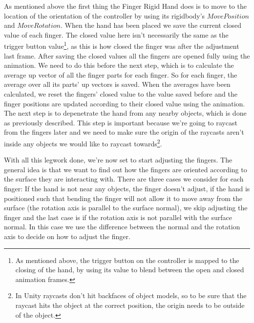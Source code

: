 As mentioned above the first thing the Finger Rigid Hand does is to move to the location of the orientation of the controller by using its rigidbody's $MovePosition$ and $MoveRotation$. When the hand has been placed we save the current closed value of each finger. The closed value here isn't necessarily the same as the trigger button value\footnote{As mentioned above, the trigger button on the controller is mapped to the closing of the hand, by using its value to blend between the open and closed animation frames.}, as this is how closed the finger was after the adjustment last frame. After saving the closed values all the fingers are opened fully using the animation. We need to do this before the next step, which is to calculate the average up vector of all the finger parts for each finger. So for each finger, the average over all its parts' up vectors is saved. When the averages have been calculated, we reset the fingers' closed value to the value saved before and the finger positions are updated according to their closed value using the animation. The next step is to depenetrate the hand from any nearby objects, which is done as previously described. This step is important because we're going to raycast from the fingers later and we need to make sure the origin of the raycasts aren't inside any objects we would like to raycast towards\footnote{In Unity raycasts don't hit backfaces of object models, so to be sure that the raycast hits the object at the correct position, the origin needs to be outside of the object.}. 

With all this legwork done, we're now set to start adjusting the fingers. The general idea is that we want to find out how the fingers are oriented according to the surface they are interacting with. There are three cases we consider for each finger: If the hand is not near any objects, the finger doesn't adjust, if the hand is positioned such that bending the finger will not allow it to move away from the surface (the rotation axis is parallel to the surface normal), we skip adjusting the finger and the last case is if the rotation axis is not parallel with the surface normal. In this case we use the difference between the normal and the rotation axis to decide on how to adjust the finger.

